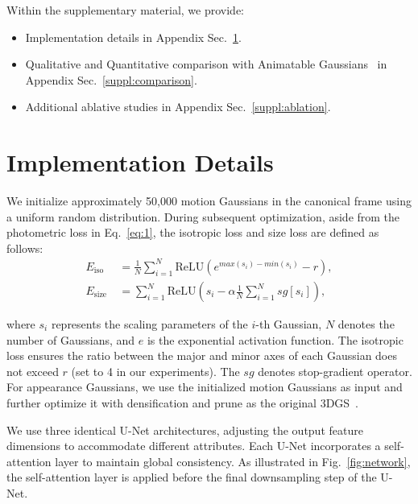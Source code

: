\clearpage
\setcounter{page}{1}
\maketitlesupplementary



Within the supplementary material, we provide:

\begin{itemize}
\item Implementation details in Appendix Sec.~\ref{suppl:detail}.
\item Qualitative and Quantitative comparison with Animatable Gaussians~\cite{li2024animatable} in Appendix Sec.~\ref{suppl:comparison}.
\item Additional ablative studies in Appendix Sec.~\ref{suppl:ablation}.
\end{itemize}


\section{Implementation Details} \label{suppl:detail} 

 We initialize approximately 50,000 motion Gaussians in the canonical frame using a uniform random distribution. During subsequent optimization, aside from the photometric loss in Eq.~\ref{eq:1},
the isotropic loss and size loss are defined as follows:
\begin{equation}
\begin{split}
E_{\mathrm{iso}} & =\frac{1}{N} \sum_{i=1}^{N} \text{ReLU}(e^{max(s_i) - min(s_i)} - r), \\
E_{\text {size }} &=\sum_{i=1}^N \text{ReLU} \left(s_i- \alpha \frac{1}{N} \sum_{i=1}^N sg[s_i] \right), 
\end{split}
\end{equation}

where $s_i$ represents the scaling parameters of the $i$-th Gaussian, $N$ denotes the number of Gaussians, and $e$ is the exponential activation function. The isotropic loss ensures the ratio between the major and minor axes of each Gaussian does not exceed $r$ (set to 4 in our experiments). The $sg$ denotes stop-gradient operator.  
For appearance Gaussians, we use the initialized motion Gaussians as input and further optimize it with densification and prune as the original 3DGS~\cite{kerbl20233d}. 

 We use three identical U-Net architectures, adjusting the output feature dimensions to accommodate different attributes. Each U-Net incorporates a self-attention layer to maintain global consistency. As illustrated in Fig.~\ref{fig:network}, the self-attention layer is applied before the final downsampling step of the U-Net.

